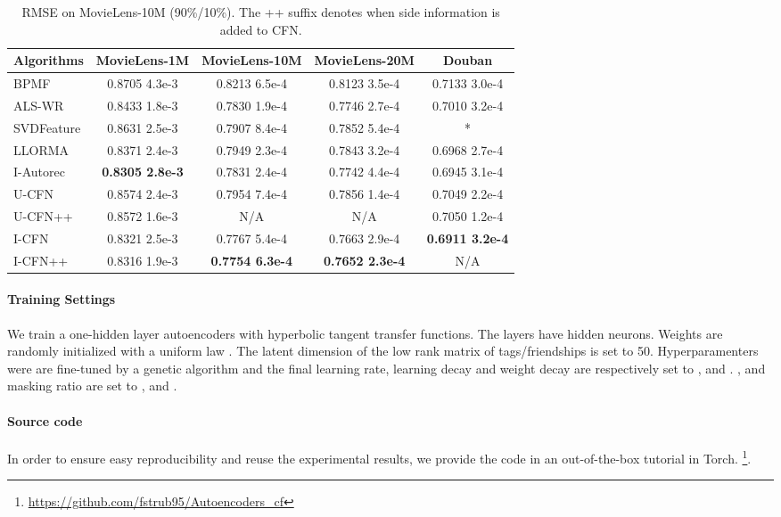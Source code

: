 \documentclass{article}
\begin{document}
\begin{table*}[t]
\centering
\begin{tabular}{lcccc}
\hline
Algorithms  & MovieLens-1M                     & MovieLens-10M             & MovieLens-20M    & Douban\\
\hline
BPMF		&         0.8705   4.3e-3  &          0.8213  6.5e-4  &           0.8123  3.5e-4     & 0.7133  3.0e-4 \\
ALS-WR      &         0.8433   1.8e-3  &          0.7830  1.9e-4  &           0.7746  2.7e-4     & 0.7010  3.2e-4 \\
SVDFeature  &         0.8631   2.5e-3  &          0.7907  8.4e-4  &           0.7852  5.4e-4     &              *      \\
LLORMA		&         0.8371   2.4e-3  &          0.7949  2.3e-4  &          0.7843  3.2e-4      & 0.6968  2.7e-4   \\
I-Autorec   &         \textbf{0.8305  2.8e-3} &   0.7831  2.4e-4  &          0.7742  4.4e-4      & 0.6945  3.1e-4 \\
\hline
U-CFN       &         0.8574   2.4e-3  &          0.7954  7.4e-4  &           0.7856  1.4e-4     & 0.7049  2.2e-4 \\
U-CFN++     &         0.8572   1.6e-3  &                N/A            &                 N/A               & 0.7050  1.2e-4 \\
I-CFN       &         0.8321   2.5e-3  &          0.7767  5.4e-4  &           0.7663  2.9e-4     & \textbf{0.6911  3.2e-4} \\
I-CFN++     &         0.8316   1.9e-3  &  \textbf{0.7754  6.3e-4} &   \textbf{0.7652  2.3e-4}       &           N/A      \\
\hline
\end{tabular}
\caption{RMSE on MovieLens-10M (90\%/10\%). The ++ suffix denotes when side information is added to CFN.}
\label{tab:RMSE}
\end{table*}

\paragraph{Training Settings}
We train a one-hidden layer autoencoders with hyperbolic tangent transfer functions. The layers have  hidden neurons. Weights are randomly initialized  with a uniform law
.
The latent dimension of the low rank matrix of tags/friendships is set to 50. Hyperparamenters were are fine-tuned by a genetic algorithm and the final learning rate, learning decay and weight decay are respectively set to ,  and . ,  and masking ratio are set to ,  and .  \paragraph{Source code} 
In order to ensure easy reproducibility and reuse the experimental results, we provide the code in an out-of-the-box tutorial in Torch. 
\footnote{
\url{https://github.com/fstrub95/Autoencoders_cf}
}. 
\end{document}
